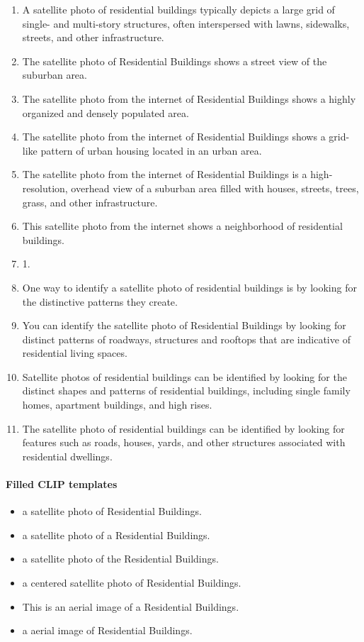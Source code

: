 \documentclass[11pt]{article}
\begin{document}
\begin{enumerate}
\item A satellite photo of residential buildings typically depicts a large grid of single- and multi-story structures, often interspersed with lawns, sidewalks, streets, and other infrastructure.
\item The satellite photo of Residential Buildings shows a street view of the suburban area.
\item The satellite photo from the internet of Residential Buildings shows a highly organized and densely populated area.
\item The satellite photo from the internet of Residential Buildings shows a grid-like pattern of urban housing located in an urban area.
\item The satellite photo from the internet of Residential Buildings is a high-resolution, overhead view of a suburban area filled with houses, streets, trees, grass, and other infrastructure.
\item This satellite photo from the internet shows a neighborhood of residential buildings.
\item 1.
\item One way to identify a satellite photo of residential buildings is by looking for the distinctive patterns they create.
\item You can identify the satellite photo of Residential Buildings by looking for distinct patterns of roadways, structures and rooftops that are indicative of residential living spaces.
\item Satellite photos of residential buildings can be identified by looking for the distinct shapes and patterns of residential buildings, including single family homes, apartment buildings, and high rises.
\item The satellite photo of residential buildings can be identified by looking for features such as roads, houses, yards, and other structures associated with residential dwellings.
\end{enumerate}
\paragraph{Filled CLIP templates}\begin{itemize}
\item a satellite photo of Residential Buildings.
\item a satellite photo of a Residential Buildings.
\item a satellite photo of the Residential Buildings.
\item a centered satellite photo of Residential Buildings.
\item This is an aerial image of a Residential Buildings.
\item a aerial image of Residential Buildings.
\end{itemize}
\end{document}
